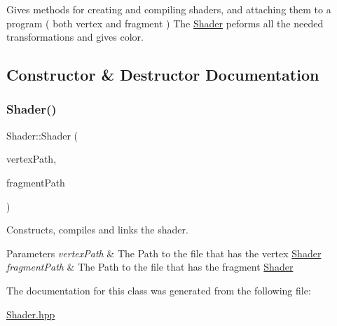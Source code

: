 Gives methods for creating and compiling shaders, and attaching them to a program ( both vertex and fragment ) The \hyperlink{class_shader}{Shader} peforms all the needed transformations and gives color. 

\subsection{Constructor \& Destructor Documentation}
\hypertarget{class_shader_a03421a8419cdad4b84cf58ecdb156879}{}\label{class_shader_a03421a8419cdad4b84cf58ecdb156879} 
\subsubsection{\texorpdfstring{Shader()}{Shader()}}
{\footnotesize\ttfamily Shader\+::\+Shader (\begin{DoxyParamCaption}\item[{const G\+Lchar $\ast$}]{vertex\+Path,  }\item[{const G\+Lchar $\ast$}]{fragment\+Path }\end{DoxyParamCaption})\hspace{0.3cm}{\ttfamily [inline]}}



Constructs, compiles and links the shader. 


\begin{DoxyParams}{Parameters}
{\em vertex\+Path} & The Path to the file that has the vertex \hyperlink{class_shader}{Shader} \\
\hline
{\em fragment\+Path} & The Path to the file that has the fragment \hyperlink{class_shader}{Shader} \\
\hline
\end{DoxyParams}


The documentation for this class was generated from the following file\+:\begin{DoxyCompactItemize}
\item 
\hyperlink{_shader_8hpp}{Shader.\+hpp}\end{DoxyCompactItemize}
